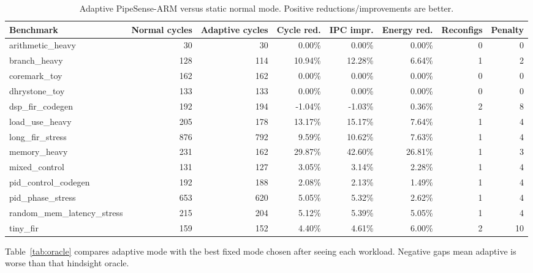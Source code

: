 \documentclass[conference]{IEEEtran}
\newcommand{\pipesense}{PipeSense-ARM}
\begin{document}
\begin{table}[t]
\centering
\caption{Adaptive \pipesense{} versus static normal mode. Positive reductions/improvements are better.}
\label{tab:adaptive}
\small
\begin{tabular}{lrrrrrrr}
\hline
Benchmark & Normal cycles & Adaptive cycles & Cycle red. & IPC impr. & Energy red. & Reconfigs & Penalty \\
\hline
arithmetic\_heavy & 30 & 30 & 0.00\% & 0.00\% & 0.00\% & 0 & 0 \\
branch\_heavy & 128 & 114 & 10.94\% & 12.28\% & 6.64\% & 1 & 2 \\
coremark\_toy & 162 & 162 & 0.00\% & 0.00\% & 0.00\% & 0 & 0 \\
dhrystone\_toy & 133 & 133 & 0.00\% & 0.00\% & 0.00\% & 0 & 0 \\
dsp\_fir\_codegen & 192 & 194 & -1.04\% & -1.03\% & 0.36\% & 2 & 8 \\
load\_use\_heavy & 205 & 178 & 13.17\% & 15.17\% & 7.64\% & 1 & 4 \\
long\_fir\_stress & 876 & 792 & 9.59\% & 10.62\% & 7.63\% & 1 & 4 \\
memory\_heavy & 231 & 162 & 29.87\% & 42.60\% & 26.81\% & 1 & 3 \\
mixed\_control & 131 & 127 & 3.05\% & 3.14\% & 2.28\% & 1 & 4 \\
pid\_control\_codegen & 192 & 188 & 2.08\% & 2.13\% & 1.49\% & 1 & 4 \\
pid\_phase\_stress & 653 & 620 & 5.05\% & 5.32\% & 2.62\% & 1 & 4 \\
random\_mem\_latency\_stress & 215 & 204 & 5.12\% & 5.39\% & 5.05\% & 1 & 4 \\
tiny\_fir & 159 & 152 & 4.40\% & 4.61\% & 6.00\% & 2 & 10 \\
\hline
\end{tabular}
\end{table}

Table~\ref{tab:oracle} compares adaptive mode with the best fixed mode chosen after seeing each workload. Negative gaps mean adaptive is worse than that hindsight oracle.
\end{document}
